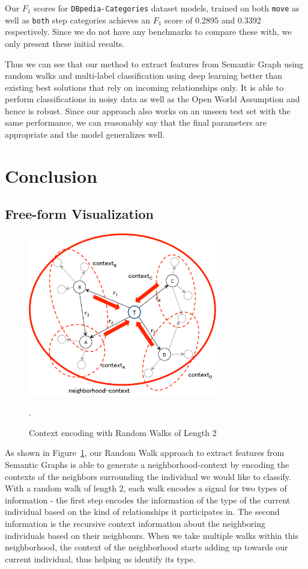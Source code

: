 \documentclass[runningheads,a4paper]{IEEEtran}
\begin{document}
Our $F_1$ scores for \texttt{DBpedia-Categories} dataset models, trained on both \texttt{move} as well as \texttt{both} step categories achieves an $F_1$ score of 0.2895 and 0.3392 respectively. Since we do not have any benchmarks to compare these with, we only present these initial results.

Thus we can see that our method to extract features from Semantic Graph using  random walks and multi-label classification using deep learning better than existing best solutions that rely on incoming relationships only. It is able to perform classifications in noisy data as well as the Open World Assumption and hence is robust. Since our approach also works on an unseen test set with the same performance, we can reasonably say that the final parameters are appropriate and the model generalizes well. 


\section{Conclusion}
\subsection{Free-form Visualization}
\begin{figure}[h]
\centering
\includegraphics[width=3.25in]{figures/context.pdf}
\caption{Context encoding with Random Walks of Length 2}
\label{context}.
\end{figure}
As shown in Figure~\ref{context}, our Random Walk approach to extract features from Semantic Graphs is able to generate a neighborhood-context by encoding the contexts of the neighbors surrounding the individual we would like to classify. With a random walk of length 2, each walk encodes a signal for two types of information - the first step encodes the information of the type of the current individual based on the kind of relationships it participates in. The second information is the recursive context information about the neighboring individuals based on their neighbours. When we take multiple walks within this neighborhood, the context of the neighborhood starts adding up towards our current individual, thus helping us identify its type.
\end{document}
